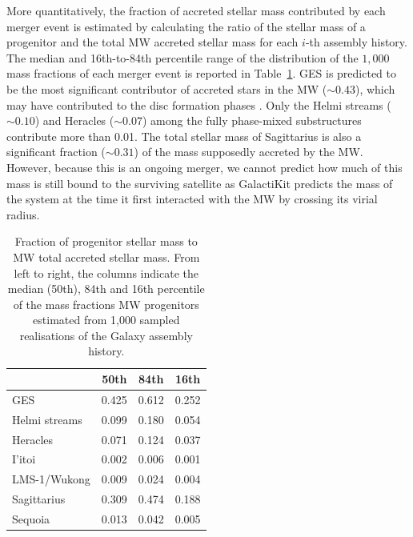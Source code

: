 More quantitatively, the fraction of accreted stellar mass contributed by each merger event is estimated by calculating the ratio of the stellar mass of a progenitor and the total MW accreted stellar mass for each $i$-th assembly history. The median and 16th-to-84th percentile range of the distribution of the $1,000$ mass fractions of each merger event is reported in Table~\ref{tab:accreted mass}. GES is predicted to be the most significant contributor of accreted stars in the MW ($\sim0.43$), which may have contributed to the disc formation phases \citep{Funakoshi2025}. Only the Helmi streams ($\sim0.10$) and Heracles ($\sim0.07$) among the fully phase-mixed substructures contribute more than 0.01. The total stellar mass of Sagittarius is also a significant fraction ($\sim0.31$) of the mass supposedly accreted by the MW. However, because this is an ongoing merger, we cannot predict how much of this mass is still bound to the surviving satellite as GalactiKit predicts the mass of the system at the time it first interacted with the MW by crossing its virial radius.

\begin{table}
    \centering
    \begin{tabular}{l c c c}
    \hline
        & 50th & 84th & 16th \\
    \hline
       GES & 0.425 & 0.612 & 0.252\\
       Helmi streams  & 0.099 & 0.180 & 0.054 \\
       Heracles & 0.071 & 0.124 & 0.037\\
       I'itoi & 0.002 & 0.006 & 0.001 \\
       LMS-1/Wukong & 0.009 & 0.024 & 0.004 \\
       Sagittarius & 0.309 & 0.474 & 0.188 \\
       Sequoia & 0.013 & 0.042 & 0.005\\
       \hline
    \end{tabular}
    \caption{Fraction of progenitor stellar mass to MW total accreted stellar mass. From left to right, the columns indicate the median (50th), 84th and 16th percentile of the mass fractions MW progenitors estimated from 1,000 sampled realisations of the Galaxy assembly history.}
    \label{tab:accreted mass}
\end{table}

